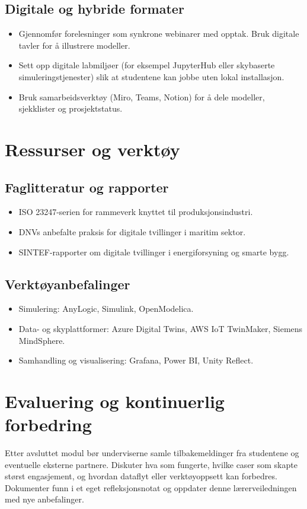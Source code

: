 \subsection{Digitale og hybride formater}
\begin{itemize}
    \item Gjennomfør forelesninger som synkrone webinarer med opptak. Bruk digitale tavler for å illustrere modeller.
    \item Sett opp digitale labmiljøer (for eksempel JupyterHub eller skybaserte simuleringstjenester) slik at studentene kan jobbe uten lokal installasjon.
    \item Bruk samarbeidsverktøy (Miro, Teams, Notion) for å dele modeller, sjekklister og prosjektstatus.
\end{itemize}

\section{Ressurser og verktøy}
\subsection{Faglitteratur og rapporter}
\begin{itemize}
    \item ISO 23247-serien for rammeverk knyttet til produksjonsindustri.
    \item DNVs anbefalte praksis for digitale tvillinger i maritim sektor.
    \item SINTEF-rapporter om digitale tvillinger i energiforsyning og smarte bygg.
\end{itemize}

\subsection{Verktøyanbefalinger}
\begin{itemize}
    \item Simulering: AnyLogic, Simulink, OpenModelica.
    \item Data- og skyplattformer: Azure Digital Twins, AWS IoT TwinMaker, Siemens MindSphere.
    \item Samhandling og visualisering: Grafana, Power BI, Unity Reflect.
\end{itemize}

\section{Evaluering og kontinuerlig forbedring}
Etter avsluttet modul bør underviserne samle tilbakemeldinger fra studentene og eventuelle eksterne partnere. Diskuter hva som fungerte, hvilke caser som skapte størst engasjement, og hvordan dataflyt eller verktøyoppsett kan forbedres. Dokumenter funn i et eget refleksjonsnotat og oppdater denne lærerveiledningen med nye anbefalinger.

